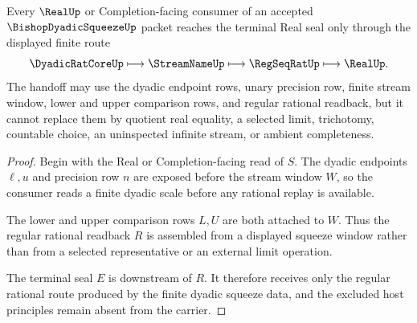\begin{theorem}
\label{thm:bishop-dyadic-squeeze-real-seal-handoff}
Every $\RealUp$ or Completion-facing consumer of an accepted $\BishopDyadicSqueezeUp$ packet reaches the terminal Real seal only through the displayed finite route
$$
\DyadicRatCoreUp
\longmapsto
\StreamNameUp
\longmapsto
\RegSeqRatUp
\longmapsto
\RealUp .
$$
The handoff may use the dyadic endpoint rows, unary precision row, finite stream window, lower and upper comparison rows, and regular rational readback, but it cannot replace them by quotient real equality, a selected limit, trichotomy, countable choice, an uninspected infinite stream, or ambient completeness.
\end{theorem}
\begin{proof}
Begin with the Real or Completion-facing read of $S$. The dyadic endpoints $\ell,u$ and precision row $n$ are exposed before the stream window $W$, so the consumer reads a finite dyadic scale before any rational replay is available.

The lower and upper comparison rows $L,U$ are both attached to $W$. Thus the regular rational readback $R$ is assembled from a displayed squeeze window rather than from a selected representative or an external limit operation.

The terminal seal $E$ is downstream of $R$. It therefore receives only the regular rational route produced by the finite dyadic squeeze data, and the excluded host principles remain absent from the carrier.
\end{proof}


\begin{closurestatus}{\BishopDyadicSqueezeUp}
  \theoryclosure{\seedClosure}
  \formalstatus{\unformalizedV}
\end{closurestatus}
